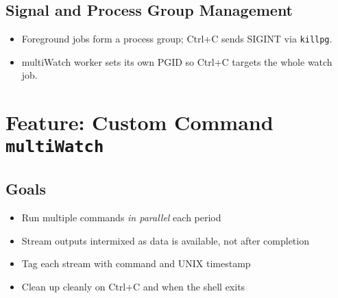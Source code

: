 \documentclass[11pt,a4paper]{article}
\begin{document}
\subsection{Signal and Process Group Management}
\begin{itemize}[leftmargin=*]
  \item Foreground jobs form a process group; Ctrl+C sends SIGINT via \texttt{killpg}.
  \item multiWatch worker sets its own PGID so Ctrl+C targets the whole watch job.
\end{itemize}

\section{Feature: Custom Command \texttt{multiWatch}}

\subsection{Goals}
\begin{itemize}[leftmargin=*]
  \item Run multiple commands \emph{in parallel} each period
  \item Stream outputs intermixed as data is available, not after completion
  \item Tag each stream with command and UNIX timestamp
  \item Clean up cleanly on Ctrl+C and when the shell exits
\end{itemize}
\end{document}
